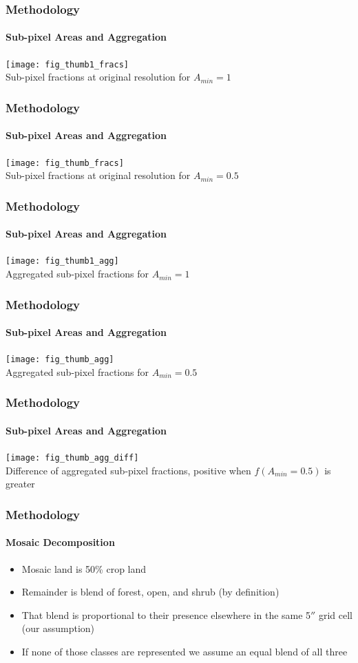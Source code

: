 \documentclass{beamer}
\begin{document}
\begin{frame}
  \frametitle{Methodology}
  \framesubtitle{Sub-pixel Areas and Aggregation}
  \begin{center}
    \texttt{[image: fig\_thumb1\_fracs]} \\
    {\tiny Sub-pixel fractions at original resolution for $A_{min}=1$}
  \end{center}
\end{frame}

\begin{frame}
  \frametitle{Methodology}
  \framesubtitle{Sub-pixel Areas and Aggregation}
  \begin{center}
    \texttt{[image: fig\_thumb\_fracs]} \\
    {\tiny Sub-pixel fractions at original resolution for $A_{min}=0.5$}
  \end{center}
\end{frame}

\begin{frame}
  \frametitle{Methodology}
  \framesubtitle{Sub-pixel Areas and Aggregation}
  \begin{center}
    \texttt{[image: fig\_thumb1\_agg]} \\
    {\tiny Aggregated sub-pixel fractions for $A_{min}=1$}
  \end{center}
\end{frame}

\begin{frame}
  \frametitle{Methodology}
  \framesubtitle{Sub-pixel Areas and Aggregation}
  \begin{center}
    \texttt{[image: fig\_thumb\_agg]} \\
    {\tiny Aggregated sub-pixel fractions for $A_{min}=0.5$}
  \end{center}
\end{frame}

\begin{frame}
  \frametitle{Methodology}
  \framesubtitle{Sub-pixel Areas and Aggregation}
  \begin{center}
    \texttt{[image: fig\_thumb\_agg\_diff]} \\
    {\tiny Difference of aggregated sub-pixel fractions, positive when $f(A_{min} = 0.5)$ is greater}
  \end{center}
\end{frame}


\begin{frame}
  \frametitle{Methodology}
  \framesubtitle{Mosaic Decomposition}
  \begin{itemize}
  \item Mosaic land is 50\% crop land
    \pause
  \item Remainder is blend of forest, open, and shrub (by definition)
    \pause
  \item That blend is proportional to their presence elsewhere in the same 5$''$ grid cell (our assumption)
    \pause
  \item If none of those classes are represented we assume an equal blend of all three
  \end{itemize}
\end{frame}
\end{document}
